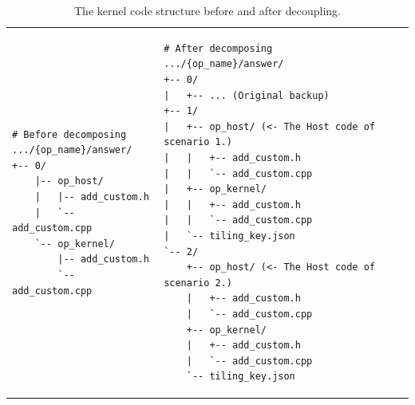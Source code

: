 \begin{table}[t]
\begin{tcolorbox}[
sharp corners,
      colframe=refgreen,
      colback=refgreen!5,
      colbacktitle=refgreen!15,
      coltitle=refgreen,
      boxrule=0.4pt,
      title={\textbf{Host-Kernel Decomposition}},
      fonttitle=\bfseries\small,
      top=-10pt, bottom=0pt, left=1pt, right=1pt
]
\begin{tabular}{p{} p{}}
\begin{lstlisting}[basicstyle=\ttfamily\scriptsize]
# Before decomposing
.../{op_name}/answer/
+-- 0/
    |-- op_host/
    |   |-- add_custom.h
    |   `-- add_custom.cpp
    `-- op_kernel/
        |-- add_custom.h
        `-- add_custom.cpp
\end{lstlisting}
&
\begin{lstlisting}[basicstyle=\ttfamily\scriptsize]
# After decomposing
.../{op_name}/answer/
+-- 0/
|   +-- ... (Original backup)
+-- 1/
|   +-- op_host/ (<- The Host code of scenario 1.)
|   |   +-- add_custom.h
|   |   `-- add_custom.cpp
|   +-- op_kernel/
|   |   +-- add_custom.h
|   |   `-- add_custom.cpp
|   `-- tiling_key.json
`-- 2/
    +-- op_host/ (<- The Host code of scenario 2.)
    |   +-- add_custom.h
    |   `-- add_custom.cpp
    +-- op_kernel/
    |   +-- add_custom.h
    |   `-- add_custom.cpp
    `-- tiling_key.json
\end{lstlisting}
\end{tabular}
\end{tcolorbox}
\caption{The kernel code structure before and after decoupling. }
\label{tab:kernel_host_decompos}
\end{table}